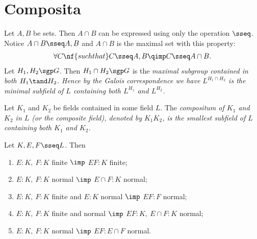 \documentclass[a4paper]{article}
\begin{document}
\section{Composita}
\begin{tremark}
  Let \( A,B \) be sets. Then \( A\cap B \) can be expressed using only the operation \( \sseq \).
  Notice \( A\cap B \sseq A,B \) and \( A\cap B \) is the maximal set with this property: \begin{align*}
    \forall C \nf{ such that } C\sseq A,B \qimp C\sseq A\cap B.
  \end{align*}
  Let \( H_1,H_2\sgp G \).
  Then \( H_1\cap H_2 \sgp G \) is the \it{maximal} subgroup contained in both \( H_1 \tand H_2 \).
  Hence by the Galois correspondence we have \( L^{H_1\cap H_2} \) is the \it{minimal} subfield of \( L \) containing both \( L^{H_1} \) and \( L^{H_2} \).
\end{tremark}
\begin{tdefinition}[Compositum]
  Let \( K_1 \) and \( K_2 \) be fields contained in some field \( L \).
  The \it{compositum} of \( K_1 \) and \( K_2 \) in \( L \) (or the \it{composite field}), denoted by \( K_1K_2 \), is the smallest subfield of \( L \) containing both \( K_1 \) and \( K_2 \).
\end{tdefinition}

\begin{tlemma}
  Let \( K,E,F \sseq L \).
  Then \begin{enumerate}
    \item \( E:K,\ F:K \) finite \( \imp \) \( EF:K \) finite;
    \item \( E:K,\ F:K \) normal \( \imp \) \( E\cap F:K \) normal;
    \item \( E:K,\ F:K \) finite and \( E:K \) normal \( \imp \) \( EF:F \) normal;
    \item \( E:K,\ F:K \) finite and normal \( \imp \) \( EF:K,\ E\cap F:K \) normal;
    \item \( E:K,\ F:K \) normal \( \imp \) \( EF:E\cap F \) normal.
  \end{enumerate}
\end{tlemma}
\end{document}
